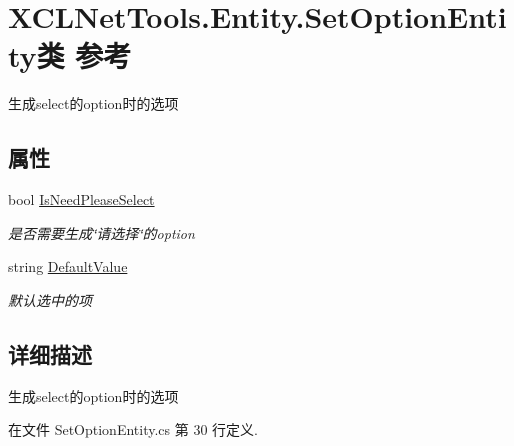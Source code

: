 \hypertarget{class_x_c_l_net_tools_1_1_entity_1_1_set_option_entity}{\section{X\-C\-L\-Net\-Tools.\-Entity.\-Set\-Option\-Entity类 参考}
\label{class_x_c_l_net_tools_1_1_entity_1_1_set_option_entity}
}


生成select的option时的选项  


\subsection*{属性}
\begin{DoxyCompactItemize}
\item 
bool \hyperlink{class_x_c_l_net_tools_1_1_entity_1_1_set_option_entity_a22c7d14f09183bb9124fa9219663be6c}{Is\-Need\-Please\-Select}
\begin{DoxyCompactList}\small\item\em 是否需要生成\char`\"{}请选择\char`\"{}的option \end{DoxyCompactList}\item 
string \hyperlink{class_x_c_l_net_tools_1_1_entity_1_1_set_option_entity_a504fe6ad96f52cb7eb9f8a4e64e07723}{Default\-Value}
\begin{DoxyCompactList}\small\item\em 默认选中的项 \end{DoxyCompactList}\end{DoxyCompactItemize}


\subsection{详细描述}
生成select的option时的选项 



在文件 Set\-Option\-Entity.\-cs 第 30 行定义.




